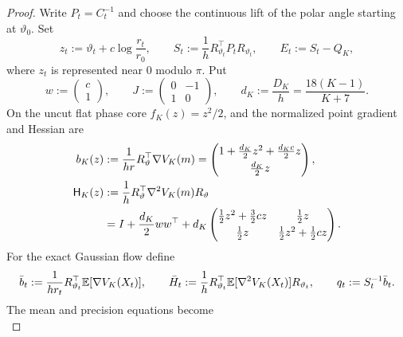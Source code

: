 \begin{proof}
    Write $P_t=C_t^{-1}$ and choose the continuous lift of the polar angle starting at
    $\vartheta_0$. Set
    \begin{equation}\label{eq:spiral-transverse-coordinates}
        z_t:=\vartheta_t+c\log\frac{r_t}{r_0},
        \qquad
        S_t:=\frac1hR_{\vartheta_t}^\top P_tR_{\vartheta_t},
        \qquad
        E_t:=S_t-Q_K,
    \end{equation}
    where $z_t$ is represented near $0$ modulo $\pi$. Put
    \begin{equation*}
        w:=\begin{pmatrix}c\\1\end{pmatrix},
        \qquad
        J:=\begin{pmatrix}0&-1\\1&0\end{pmatrix},
        \qquad
        d_K:=\frac{D_K}h=\frac{18(K-1)}{K+7} .
    \end{equation*}
    On the uncut flat phase core $f_K(z)=z^2/2$, and the normalized point gradient and Hessian
    are
    \begin{align}
    \label{eq:spiral-core-point-fields}
        b_K(z)
        &:=\frac1{hr}R_\vartheta^\top\nabla V_K(m)
        =\begin{pmatrix}1+\frac{d_K}2z^2+\frac{d_Kc}2z\\[1mm]\frac{d_K}2z\end{pmatrix},\\
        \mathsf H_K(z)
        &:=\frac1hR_\vartheta^\top\nabla^2V_K(m)R_\vartheta\notag\\
        &=I+\frac{d_K}2ww^\top
          +d_K\begin{pmatrix}
              \frac12z^2+\frac32cz&\frac12z\\[1mm]
              \frac12z&\frac12z^2+\frac12cz
          \end{pmatrix}.\notag
    \end{align}
    For the exact Gaussian flow define
    \begin{equation*}
        \bar b_t:=\frac1{hr_t}R_{\vartheta_t}^\top\mathbb{E}[\nabla V_K(X_t)],
        \qquad
        \bar H_t:=\frac1hR_{\vartheta_t}^\top\mathbb{E}[\nabla^2V_K(X_t)]R_{\vartheta_t},
        \qquad
        q_t:=S_t^{-1}\bar b_t .
    \end{equation*}
    The mean and precision equations become
    \begin{equation}\label{eq:spiral-rotated-system}

\end{equation}
\end{proof}
